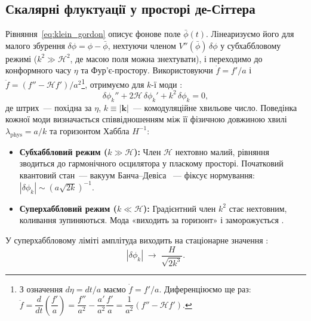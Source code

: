 \documentclass[12pt, a4paper]{article}
\begin{document}
\subsection{Скалярні флуктуації у просторі де-Сіттера}

Рівняння~\eqref{eq:klein_gordon} описує фонове поле $\bar{\phi}(t)$.
Лінеаризуємо його для малого збурення $\delta\phi = \phi - \bar{\phi}$,
нехтуючи членом $V''(\bar{\phi})\,\delta\phi$ у субхаббловому режимі
($k^2 \gg \mathcal{H}^2$, де масою поля можна знехтувати), і переходимо
до конформного часу $\eta$ та Фур'є-простору. Використовуючи
$\dot{f} = f'/a$ і $\ddot{f} = (f'' - \mathcal{H}f')/a^2$\footnote{%
З означення $d\eta = dt/a$ маємо $\dot{f} = f'/a$.
Диференціюємо ще раз:
$\ddot{f} = \dfrac{d}{dt}\!\left(\dfrac{f'}{a}\right)
= \dfrac{f''}{a^2} - \dfrac{a'}{a^2}\dfrac{f'}{a}
= \dfrac{1}{a^2}(f'' - \mathcal{H}f')$.},
отримуємо для $k$-ї моди \cite{mukhanov_2005}:
\begin{equation}\label{eq:fourier_field}
  \delta\phi_k'' + 2\mathcal{H}\,\delta\phi_k'
  + k^2\,\delta\phi_k = 0,
\end{equation}
де штрих~--- похідна за $\eta$, $k \equiv |\mathbf{k}|$~---
комодуляційне хвильове число. Поведінка кожної моди визначається
співвідношенням між її фізичною довжиною хвилі
$\lambda_\mathrm{phys} = a/k$ та горизонтом Хаббла $H^{-1}$:

\begin{itemize}
  \item \textbf{Субхаббловий режим ($k \gg \mathcal{H}$):}
        Член $\mathcal{H}$ нехтовно малий, рівняння зводиться до
        гармонічного осцилятора у пласкому просторі.
        Початковий квантовий стан~--- вакуум Банча--Девіса
        \cite{bunch_davies_1978}~--- фіксує нормування:
        $|\delta\phi_k| \sim (a\sqrt{2k})^{-1}$.
  \item \textbf{Суперхаббловий режим ($k \ll \mathcal{H}$):}
        Градієнтний член $k^2$ стає нехтовним, коливання
        зупиняються. Мода «виходить за горизонт» і
        заморожується \cite{hawking_1982}.
\end{itemize}

У суперхаббловому ліміті амплітуда виходить на стаціонарне
значення \cite{guth_pi_1982}:
\begin{equation*}
  |\delta\phi_k| \;\to\; \frac{H}{\sqrt{2k^3}}.
\end{equation*}
\end{document}
